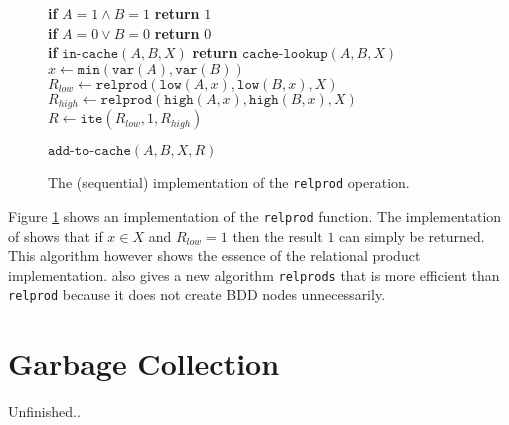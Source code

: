 \begin{figure}
	\centering
	\begin{algorithm}[H]
		\SetStartEndCondition{ }{}{}%
		\AlgoDontDisplayBlockMarkers\SetAlgoNoEnd\SetAlgoNoLine%

		 {
			\textbf{if} $A=1 \wedge B=1$ \textbf{return} $1$ \\
			\textbf{if} $A=0 \vee B=0$ \textbf{return} $0$ \\
			\textbf{if} $\texttt{in-cache}(A, B, X)$ \textbf{return} $\texttt{cache-lookup}(A, B, X)$ \\
			$x \gets \texttt{min}(\texttt{var}(A), \texttt{var}(B))$ \\
			$R_{low} \gets \texttt{relprod}(\texttt{low}(A, x), \texttt{low}(B, x), X)$ \\
			$R_{high} \gets \texttt{relprod}(\texttt{high}(A, x), \texttt{high}(B, x), X)$ \\

			 {
				$R \gets \texttt{ite}(R_{low}, 1, R_{high})$
			}
			
			$\texttt{add-to-cache}(A, B, X, R)$ \\
		}
	\end{algorithm}

	\caption{The (sequential) implementation of the \texttt{relprod} operation.}
	\label{fig:relprod_seq}
\end{figure}

Figure \ref{fig:relprod_seq} shows an implementation of the \texttt{relprod} function. The implementation of \cite{dijk2012parallelization} shows that if $x \in X$ and $R_{low} = 1$ then the result $1$ can simply be returned. This algorithm however shows the essence of the relational product implementation. \cite{dijk2012parallelization} also gives a new algorithm \texttt{relprods} that is more efficient than \texttt{relprod} because it does not create BDD nodes unnecessarily.

\section{Garbage Collection}
Unfinished..


